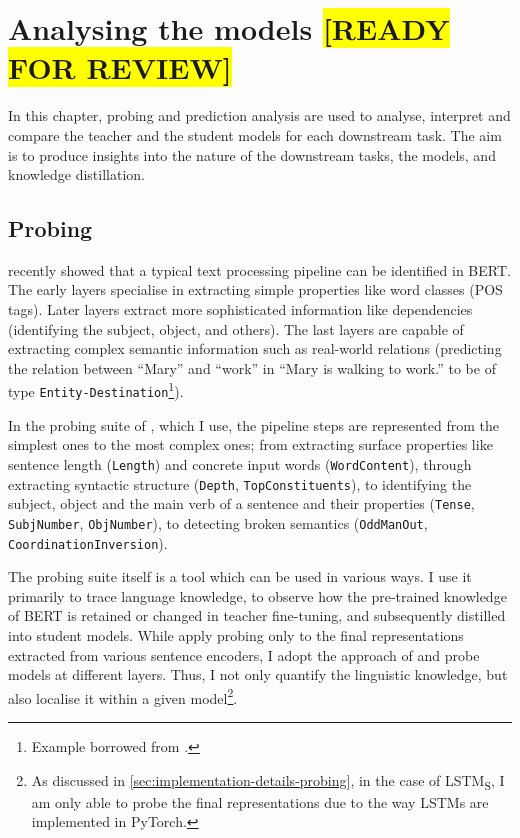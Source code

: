 \documentclass[bsc,frontabs,twoside,singlespacing,parskip,deptreport]{infthesis}
\def\reviewready{\colorbox{yellow}{[READY FOR REVIEW]}}
\def\LSTMS{LSTM\textsubscript{S}}
\begin{document}
\chapter{Analysing the models \reviewready}{
  In this chapter, probing and prediction analysis are used to analyse, interpret and compare the teacher and the student models for each downstream task. 
  The aim is to produce insights into the nature of the downstream tasks, the models, and knowledge distillation.

  \section{Probing}{
    \citet{Tenney_2019b} recently showed that a typical text processing pipeline can be identified in BERT. The early layers specialise in extracting simple properties like word classes (POS tags).
    Later layers extract more sophisticated information like dependencies (identifying the subject, object, and others).
    The last layers are capable of extracting complex semantic information such as real-world relations (predicting the relation between ``Mary'' and ``work'' in ``Mary is walking to work.'' to be of type \verb|Entity-Destination|\footnote{Example borrowed from \citet[p. 4]{Tenney_2019a}.}).
    
    In the probing suite of \citet{Conneau_2018}, which I use, the pipeline steps are represented from the simplest ones to the most complex ones; from extracting surface properties like sentence length (\verb|Length|) and concrete input words (\verb|WordContent|), through extracting syntactic structure (\verb|Depth|, \verb|TopConstituents|), to identifying the subject, object and the main verb of a sentence and their properties (\verb|Tense|, \verb|SubjNumber|, \verb|ObjNumber|), to detecting broken semantics (\verb|OddManOut|, \verb|CoordinationInversion|).

    The probing suite itself is a tool which can be used in various ways. I use it primarily to trace language knowledge, to observe how the pre-trained knowledge of BERT is retained or changed in teacher fine-tuning, and subsequently distilled into student models.
    While \citeauthor{Conneau_2018} apply probing only to the final representations extracted from various sentence encoders, I adopt the approach of \citeauthor{Tenney_2019b} and probe models at different layers. Thus, I not only quantify the linguistic knowledge, but also localise it within a given model\footnote{As discussed in \autoref{sec:implementation-details-probing}, in the case of \LSTMS, I am only able to probe the final representations due to the way LSTMs are implemented in PyTorch.}.
    
}}
\end{document}
